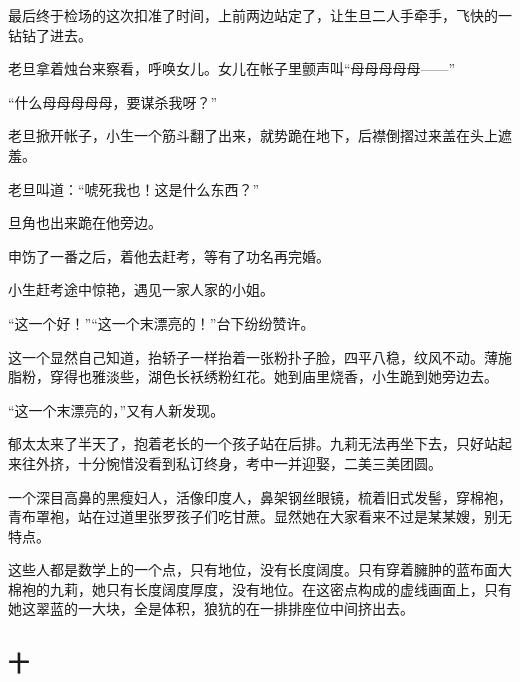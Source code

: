 \par 最后终于检场的这次扣准了时间，上前两边站定了，让生旦二人手牵手，飞快的一钻钻了进去。
\par 老旦拿着烛台来察看，呼唤女儿。女儿在帐子里颤声叫“母母母母母——”
\par “什么母母母母母，要谋杀我呀？”
\par 老旦掀开帐子，小生一个筋斗翻了出来，就势跪在地下，后襟倒摺过来盖在头上遮羞。
\par 老旦叫道：“唬死我也！这是什么东西？”
\par 旦角也出来跪在他旁边。
\par 申饬了一番之后，着他去赶考，等有了功名再完婚。
\par 小生赶考途中惊艳，遇见一家人家的小姐。
\par “这一个好！”“这一个末漂亮的！”台下纷纷赞许。
\par 这一个显然自己知道，抬轿子一样抬着一张粉扑子脸，四平八稳，纹风不动。薄施脂粉，穿得也雅淡些，湖色长袄绣粉红花。她到庙里烧香，小生跪到她旁边去。
\par “这一个末漂亮的，”又有人新发现。
\par 郁太太来了半天了，抱着老长的一个孩子站在后排。九莉无法再坐下去，只好站起来往外挤，十分惋惜没看到私订终身，考中一并迎娶，二美三美团圆。
\par 一个深目高鼻的黑瘦妇人，活像印度人，鼻架钢丝眼镜，梳着旧式发髻，穿棉袍，青布罩袍，站在过道里张罗孩子们吃甘蔗。显然她在大家看来不过是某某嫂，别无特点。
\par 这些人都是数学上的一个点，只有地位，没有长度阔度。只有穿着臃肿的蓝布面大棉袍的九莉，她只有长度阔度厚度，没有地位。在这密点构成的虚线画面上，只有她这翠蓝的一大块，全是体积，狼犺的在一排排座位中间挤出去。

\subsection{十}

